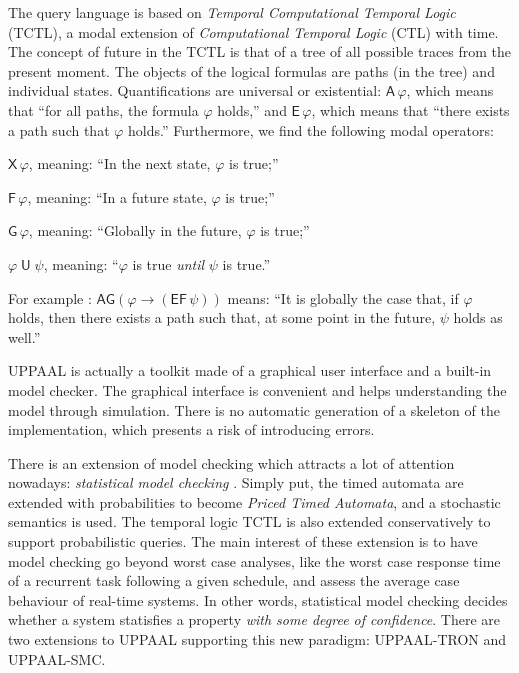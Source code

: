 \documentclass[a4paper,11pt,twoside]{article}
\newcommand\UPPAAL{\textsf{UPPAAL}\xspace}
\newcommand\UPPAALTRON{\textsf{UPPAAL-TRON}\xspace}
\newcommand\UPPAALSMC{\textsf{UPPAAL-SMC}\xspace}
\begin{document}
The query language is based on \emph{Temporal Computational Temporal
  Logic} (TCTL), a modal extension of \emph{Computational Temporal
  Logic} (CTL) with time. The concept of future in the TCTL is that of
a tree of all possible traces from the present moment. The objects of
the logical formulas are paths (in the tree) and individual states.
Quantifications are universal or existential: $\textsf{A} \, \varphi$,
which means that ``for all paths, the formula $\varphi$ holds,'' and
$\textsf{E}\, \varphi$, which means that ``there exists a path such
that $\varphi$ holds.'' Furthermore, we find the following modal
operators:
\begin{itemize*}

  \item $\textsf{X} \, \varphi$, meaning: ``In the next state,
    $\varphi$ is true;''

  \item $\textsf{F}\,\varphi$, meaning: ``In a future state, $\varphi$
    is true;''

  \item $\textsf{G} \, \varphi$, meaning: ``Globally in the future,
    $\varphi$ is true;''

  \item $\varphi \mathrel{\textsf{U}} \psi$, meaning: ``$\varphi$ is
    true \emph{until} $\psi$ is true.''

\end{itemize*}
For example \citep{Raimondi:2008}: $\textsf{AG}(\varphi \rightarrow
(\textsf{EF}\,\psi))$ means: ``It is globally the case that, if $\varphi$
holds, then there exists a path such that, at some point in the
future, $\psi$ holds as well.''

\UPPAAL is actually a toolkit made of a graphical user interface and a
built\hyp{}in model checker. The graphical interface is convenient and
helps understanding the model through simulation. There is no
automatic generation of a skeleton of the implementation, which
presents a risk of introducing errors.

There is an extension of model checking which attracts a lot of
attention nowadays: \emph{statistical model checking}
\citep{David:2012,LegayDavid:2012}. Simply put, the timed automata are
extended with probabilities to become \emph{Priced Timed Automata},
and a stochastic semantics is used. The temporal logic TCTL is also
extended conservatively to support probabilistic queries. The main
interest of these extension is to have model checking go beyond worst
case analyses, like the worst case response time of a recurrent task
following a given schedule, and assess the average case behaviour of
real\hyp{}time systems. In other words, statistical model checking
decides whether a system statisfies a property \emph{with some degree
  of confidence}. There are two extensions to \UPPAAL supporting this
new paradigm: \UPPAALTRON \citep{LarsenMikucionisNielsen:2009} and
\UPPAALSMC \citep{Bulychev_et_al:2012}.
\end{document}
